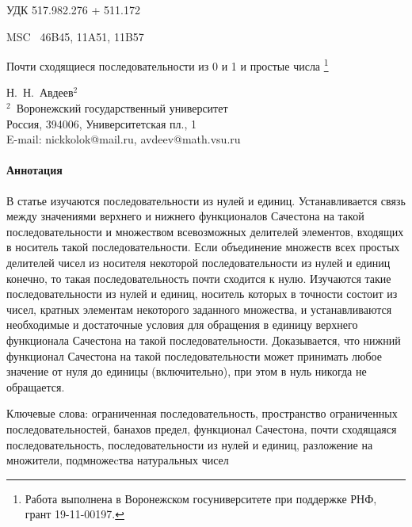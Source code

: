 \documentclass[a4paper,openbib]{article}
\theoremstyle{definition}
\begin{document}
УДК  { 517.982.276 %
     + 511.172    }%

MSC~
	46B45,
	11A51,
	11B57



\begin{center}
	Почти сходящиеся последовательности из 0 и 1 и простые числа
	\footnote{
		Работа выполнена в Воронежском госуниверситете при поддержке РНФ, грант 19-11-00197.
	}
\end{center}

\begin{center}
	{Н.~Н.~Авдеев$^{2}$\\[4pt]}
	{\rm\footnotesize{$^2$\,
	Воронежский государственный университет\\
	Россия, 394006, Университетская пл., 1\\
	E-mail: nickkolok@mail.ru, avdeev@math.vsu.ru}}
\end{center}



\paragraph{Аннотация}
В статье изучаются последовательности из нулей и единиц.
Устанавливается связь между значениями верхнего и нижнего функционалов Сачестона
на такой последовательности и множеством всевозможных делителей
элементов, входящих в носитель такой последовательности.
Если объединение множеств всех простых делителей чисел из носителя некоторой последовательности
из нулей и единиц конечно, то такая последовательность почти сходится к нулю.
Изучаются такие последовательности из нулей и единиц,
носитель которых в точности состоит из чисел,
кратных элементам некоторого заданного множества,
и устанавливаются необходимые и достаточные условия для обращения в единицу верхнего функционала Сачестона
на такой последовательности.
Доказывается, что нижний функционал Сачестона на такой последовательности
может принимать любое значение от нуля до единицы (включительно),
при этом в нуль никогда не обращается.



Ключевые слова:
	ограниченная последовательность,
	пространство ограниченных последовательностей,
	банахов предел,
	функционал Сачестона,
	почти сходящаяся последовательность,
	последовательности из нулей и единиц,
	разложение на множители,
	подмножеcтва натуральных чисел
\end{document}
